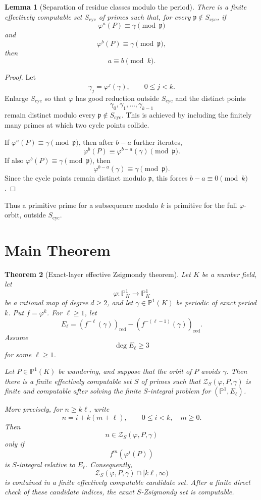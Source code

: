 \documentclass[11pt]{article}
\newtheorem{theorem}{Theorem}[section]
\newtheorem{lemma}[theorem]{Lemma}
\begin{document}
\begin{lemma}[Separation of residue classes modulo the period]
There is a finite effectively computable set \(S_{\mathrm{cyc}}\) of primes such that, for every \(\mathfrak p\notin S_{\mathrm{cyc}}\), if
\[
\varphi^a(P)\equiv\gamma\pmod{\mathfrak p}
\]
and
\[
\varphi^b(P)\equiv\gamma\pmod{\mathfrak p},
\]
then
\[
a\equiv b\pmod k.
\]
\end{lemma}

\begin{proof}
Let
\[
\gamma_j=\varphi^j(\gamma),
\qquad
0\le j<k.
\]
Enlarge \(S_{\mathrm{cyc}}\) so that \(\varphi\) has good reduction outside \(S_{\mathrm{cyc}}\) and the distinct points
\[
\gamma_0,\gamma_1,\ldots,\gamma_{k-1}
\]
remain distinct modulo every \(\mathfrak p\notin S_{\mathrm{cyc}}\). This is achieved by including the finitely many primes at which two cycle points collide.

If \(\varphi^a(P)\equiv\gamma\pmod{\mathfrak p}\), then after \(b-a\) further iterates,
\[
\varphi^b(P)\equiv \varphi^{b-a}(\gamma)\pmod{\mathfrak p}.
\]
If also \(\varphi^b(P)\equiv\gamma\pmod{\mathfrak p}\), then
\[
\varphi^{b-a}(\gamma)\equiv\gamma\pmod{\mathfrak p}.
\]
Since the cycle points remain distinct modulo \(\mathfrak p\), this forces \(b-a\equiv0\pmod k\).
\end{proof}

Thus a primitive prime for a subsequence modulo \(k\) is primitive for the full \(\varphi\)-orbit, outside \(S_{\mathrm{cyc}}\).

\section{Main Theorem}

\begin{theorem}[Exact-layer effective Zsigmondy theorem]
Let \(K\) be a number field, let
\[
\varphi:\mathbb P^1_K\to\mathbb P^1_K
\]
be a rational map of degree \(d\ge2\), and let \(\gamma\in\mathbb P^1(K)\) be periodic of exact period \(k\). Put \(f=\varphi^k\). For \(\ell\ge1\), let
\[
E_\ell=(f^{-\ell}(\gamma))_{\mathrm{red}}-(f^{-(\ell-1)}(\gamma))_{\mathrm{red}}.
\]
Assume
\[
\deg E_\ell\ge3
\]
for some \(\ell\ge1\).

Let \(P\in\mathbb P^1(K)\) be wandering, and suppose that the orbit of \(P\) avoids \(\gamma\). Then there is a finite effectively computable set \(S\) of primes such that \(\mathcal Z_S(\varphi,P,\gamma)\) is finite and computable after solving the finite \(S\)-integral problem for \((\mathbb P^1,E_\ell)\).

More precisely, for \(n\ge k\ell\), write
\[
n=i+k(m+\ell),
\qquad
0\le i<k,\quad m\ge0.
\]
Then
\[
n\in\mathcal Z_S(\varphi,P,\gamma)
\]
only if
\[
f^m(\varphi^i(P))
\]
is \(S\)-integral relative to \(E_\ell\). Consequently,
\[
\mathcal Z_S(\varphi,P,\gamma)\cap[k\ell,\infty)
\]
is contained in a finite effectively computable candidate set. After a finite direct check of these candidate indices, the exact \(S\)-Zsigmondy set is computable.
\end{theorem}
\end{document}

